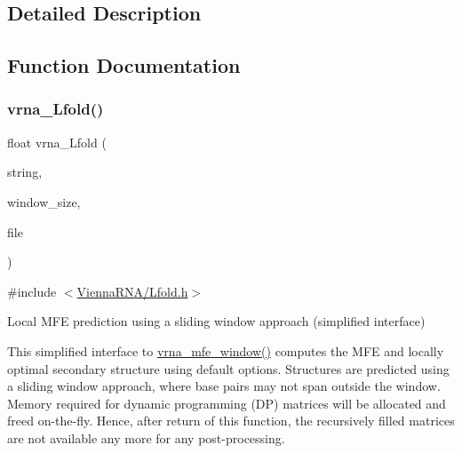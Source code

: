 \subsection{Detailed Description}


\subsection{Function Documentation}
\mbox{\label{group__local__mfe__fold_ga4918cce52bf69c1913cda503b2ac75d8}} 
\subsubsection{\texorpdfstring{vrna\+\_\+\+Lfold()}{vrna\_Lfold()}}
{\footnotesize\ttfamily float vrna\+\_\+\+Lfold (\begin{DoxyParamCaption}\item[{const char $\ast$}]{string,  }\item[{int}]{window\+\_\+size,  }\item[{F\+I\+LE $\ast$}]{file }\end{DoxyParamCaption})}



{\ttfamily \#include $<$\hyperlink{Lfold_8h}{Vienna\+R\+N\+A/\+Lfold.\+h}$>$}



Local M\+FE prediction using a sliding window approach (simplified interface) 

This simplified interface to \hyperlink{group__local__mfe__fold_ga689df235a1915a1ad56e377383c044ce}{vrna\+\_\+mfe\+\_\+window()} computes the M\+FE and locally optimal secondary structure using default options. Structures are predicted using a sliding window approach, where base pairs may not span outside the window. Memory required for dynamic programming (DP) matrices will be allocated and free\textquotesingle{}d on-\/the-\/fly. Hence, after return of this function, the recursively filled matrices are not available any more for any post-\/processing.

